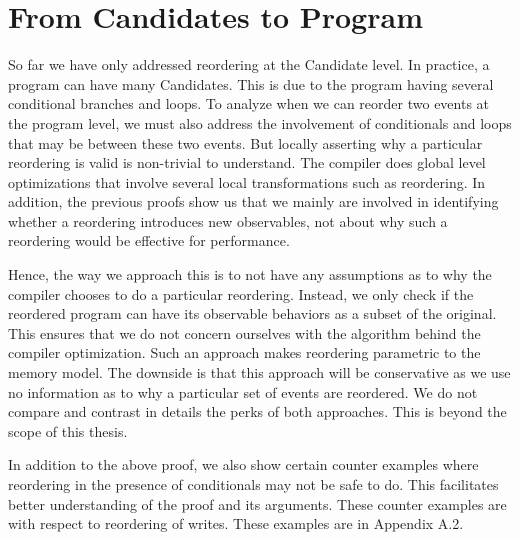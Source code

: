 \section{From Candidates to Program}

    So far we have only addressed reordering at the Candidate level. 
    In practice, a program can have many Candidates. 
    This is due to the program having several conditional branches and loops. 
    To analyze when we can reorder two events at the program level, we must also address the involvement of conditionals and loops that may be between these two events.
    But locally asserting why a particular reordering is valid is non-trivial to understand. 
    The compiler does global level optimizations that involve several local transformations such as reordering. 
    In addition, the previous proofs show us that we mainly are involved in identifying whether a reordering introduces new observables, not about why such a reordering would be effective for performance.

    Hence, the way we approach this is to not have any assumptions as to why the compiler chooses to do a particular reordering. 
    Instead, we only check if the reordered program can have its observable behaviors as a subset of the original. 
    This ensures that we do not concern ourselves with the algorithm behind the compiler optimization. 
    Such an approach makes reordering parametric to the memory model. 
    The downside is that this approach will be conservative as we use no information as to why a particular set of events are reordered. 
    We do not compare and contrast in details the perks of both approaches. 
    This is beyond the scope of this thesis.
    
    

    In addition to the above proof, we also show certain counter examples where reordering in the presence of conditionals may not be safe to do. 
    This facilitates better understanding of the proof and its arguments. 
    These counter examples are with respect to reordering of writes. 
    These examples are in Appendix A.2.

    